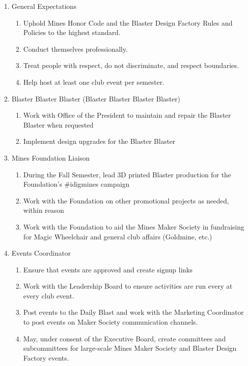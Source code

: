 \documentclass[12pt,letterpaper]{article}
\begin{document}
\begin{enumerate}
    \item General Expectations 
    \begin{enumerate}
        \item Uphold Mines Honor Code and the Blaster Design Factory Rules and Policies to the highest standard. 
        \item Conduct themselves professionally.
        \item Treat people with respect, do not discriminate, and respect boundaries.
        \item Help host at least one club event per semester.
    \end{enumerate}
    \item Blaster Blaster Blaster (Blaster Blaster Blaster Blaster) 
    \begin{enumerate}
        \item Work with Office of the President to maintain and repair the Blaster Blaster when requested
        \item Implement design upgrades for the Blaster Blaster 
    \end{enumerate}
    \item Mines Foundation Liaison 
    \begin{enumerate}
        \item During the Fall Semester, lead 3D printed Blaster production for the Foundation’s \#idigmines campaign
        \item Work with the Foundation on other promotional projects as needed, within reason
        \item Work with the Foundation to aid the Mines Maker Society in fundraising for Magic Wheelchair and general club affairs (Goldmine, etc.)
    \end{enumerate}
    \item Events Coordinator  
    \begin{enumerate}
        \item Ensure that events are approved and create signup links
        \item Work with the Leadership Board to ensure activities are run every at every club event. 
        \item Post events to the Daily Blast and work with the Marketing Coordinator to post events on Maker Society communication channels.
        \item May, under consent of the Executive Board, create committees and subcommittees for large-scale Mines Maker Society and Blaster Design Factory events.

\end{enumerate}
\end{enumerate}
\end{document}
